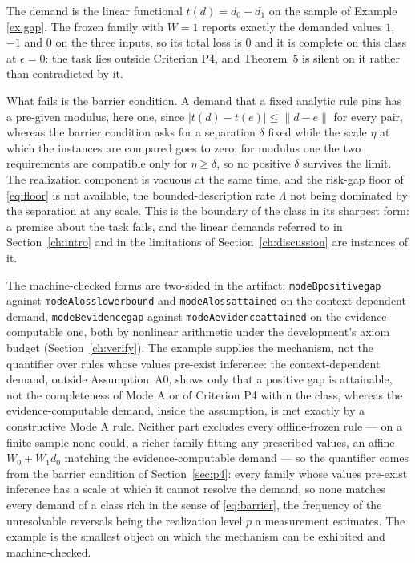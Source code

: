 \begin{example}
\label{ex:p4fails}
The demand is the linear functional $t(d) = d_0 - d_1$ on the sample of Example \ref{ex:gap}. The frozen family with $W = 1$ reports exactly the demanded values $1$, $-1$ and $0$ on the three inputs, so its total loss is $0$ and it is complete on this class at $\epsilon = 0$: the task lies outside Criterion P4, and Theorem~5 is silent on it rather than contradicted by it.

What fails is the barrier condition. A demand that a fixed analytic rule pins has a pre-given modulus, here one, since $|t(d) - t(e)| \le \| d - e \|$ for every pair, whereas the barrier condition asks for a separation $\delta$ fixed while the scale $\eta$ at which the instances are compared goes to zero; for modulus one the two requirements are compatible only for $\eta \ge \delta$, so no positive $\delta$ survives the limit. The realization component is vacuous at the same time, and the risk-gap floor of \eqref{eq:floor} is not available, the bounded-description rate $\Lambda$ not being dominated by the separation at any scale. This is the boundary of the class in its sharpest form: a premise about the task fails, and the linear demands referred to in Section~\ref{ch:intro} and in the limitations of Section~\ref{ch:discussion} are instances of it.
\end{example}

The machine-checked forms are two-sided in the artifact: \texttt{modeB\ttu positive\ttu gap} against \texttt{modeA\ttu loss\ttu lower\ttu bound} and \texttt{modeA\ttu loss\ttu attained} on the context-dependent demand, \texttt{modeB\ttu evidence\ttu gap} against \texttt{modeA\ttu evidence\ttu attained} on the evidence-computable one, both by nonlinear arithmetic under the development's axiom budget (Section~\ref{ch:verify}). The example supplies the mechanism, not the quantifier over rules whose values pre-exist inference: the context-dependent demand, outside Assumption~A0, shows only that a positive gap is attainable, not the completeness of Mode A or of Criterion P4 within the class, whereas the evidence-computable demand, inside the assumption, is met exactly by a constructive Mode A rule. Neither part excludes every offline-frozen rule --- on a finite sample none could, a richer family fitting any prescribed values, an affine $W_0 + W_1 d_0$ matching the evidence-computable demand --- so the quantifier comes from the barrier condition of Section~\ref{sec:p4}: every family whose values pre-exist inference has a scale at which it cannot resolve the demand, so none matches every demand of a class rich in the sense of \eqref{eq:barrier}, the frequency of the unresolvable reversals being the realization level $p$ a measurement estimates. The example is the smallest object on which the mechanism can be exhibited and machine-checked.

